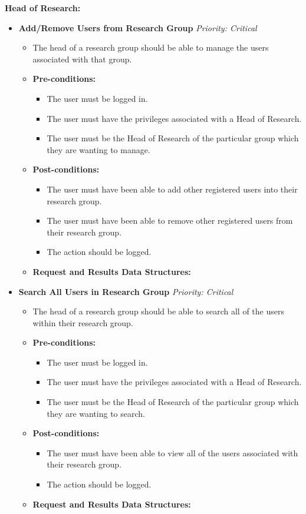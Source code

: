 \documentclass{article}
\begin{document}
				\textbf{Head of Research:}
				
				\begin{itemize}
					\item \textbf{Add/Remove Users from Research Group} \hfill \textit{Priority: Critical}
					\begin{itemize}
						\item The head of a research group should be able to manage the users associated with that group.
						\item \textbf{Pre-conditions:}
						\begin{itemize}
							\item The user must be logged in.
							\item The user must have the privileges associated with a Head of Research.
							\item The user must be the Head of Research of the particular group which they are wanting to manage.
						\end{itemize}
						\item \textbf{Post-conditions:}
						\begin{itemize}
							\item The user must have been able to add other registered users into their research group.
							\item The user must have been able to remove other registered users from their research group.
							\item The action should be logged.
						\end{itemize}
						\item \textbf{Request and Results Data Structures:}
					\end{itemize}
					
					\item \textbf{Search All Users in Research Group} \hfill \textit{Priority: Critical}
					\begin{itemize}
						\item The head of a research group should be able to search all of the users within their research group.
						\item \textbf{Pre-conditions:}
						\begin{itemize}
							\item The user must be logged in.
							\item The user must have the privileges associated with a Head of Research.
							\item The user must be the Head of Research of the particular group which they are wanting to search.
						\end{itemize}
						\item \textbf{Post-conditions:}
						\begin{itemize}
							\item The user must have been able to view all of the users associated with their research group.
							\item The action should be logged.
						\end{itemize}
						\item \textbf{Request and Results Data Structures:}
					\end{itemize}
					

\end{itemize}
\end{document}
